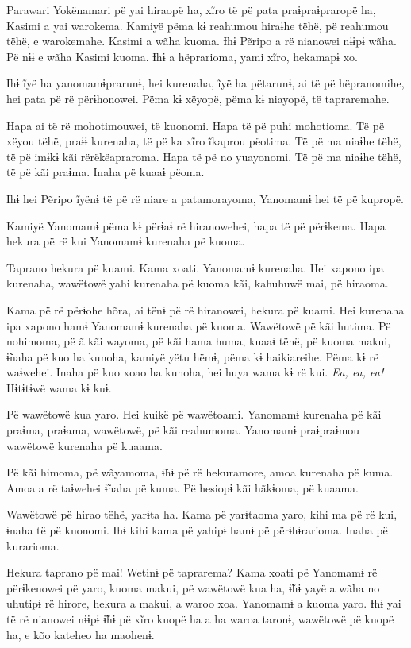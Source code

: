 Parawari Yokënamari pë yai hiraopë ha, xĩro të pë pata praɨpraɨpraropë
ha, Kasimi a yai warokema. Kamiyë pëma kɨ reahumou hiraɨhe tëhë, pë
reahumou tëhë, e warokemahe. Kasimi a wãha kuoma. Ɨhɨ Pẽripo a rë
nianowei nɨɨpɨ wãha. Pë nɨɨ e wãha Kasimi kuoma. Ɨhɨ a hëprarioma, yami
xĩro, hekamapɨ xo. 

Ɨhɨ ĩyë ha yanomamɨprarunɨ, hei kurenaha, ĩyë ha pëtarunɨ, ai të pë
hëpranomihe, hei pata pë rë përɨhonowei. Pëma kɨ xëyopë, pëma kɨ
niayopë, të tapraremahe. 

Hapa ai të rë mohotimouwei, të kuonomi. Hapa të pë puhi mohotioma. Të pë
xëyou tëhë, praɨɨ kurenaha, të pë ka xĩro ĩkaprou pëotima. Të pë ma
niaɨhe tëhë, të pë imɨkɨ kãi rërëkëapraroma. Hapa të pë no yuayonomi. Të
pë ma niaɨhe tëhë, të pë kãi praɨma. Ɨnaha pë kuaaɨ pëoma. 

Ɨhɨ hei Pẽripo ĩyënɨ të pë rë niare a patamorayoma, Yanomamɨ hei të pë
kupropë.  

Kamiyë Yanomamɨ pëma kɨ përɨaɨ rë hiranowehei, hapa të pë përɨkema. Hapa
hekura pë rë kui Yanomamɨ kurenaha pë kuoma. 

Taprano hekura pë kuami. Kama xoati. Yanomamɨ kurenaha. Hei xapono ipa
kurenaha, wawëtowë yahi kurenaha pë kuoma kãi, kahuhuwë mai, pë
hiraoma. 

Kama pë rë përɨohe hõra, ai tënɨ pë rë hiranowei, hekura pë kuami. Hei
kurenaha ipa xapono hamɨ Yanomamɨ kurenaha pë kuoma. Wawëtowë pë kãi
hutima. Pë nohimoma, pë ã kãi wayoma, pë kãi hama huma, kuaaɨ tëhë, pë
kuoma makui, ɨ̃naha pë kuo ha kunoha, kamiyë yëtu hëmɨ, pëma kɨ
haikiareihe. Pëma kɨ rë waɨwehei. Ɨnaha pë kuo xoao ha kunoha, hei huya
wama kɨ rë kui. \textit{Ea, ea, ea!} Hɨtɨtɨwë wama kɨ kuɨ. 

Pë wawëtowë kua yaro. Hei kuikë pë wawëtoami. Yanomamɨ kurenaha pë kãi
praɨma, praɨama, wawëtowë, pë kãi reahumoma. Yanomamɨ praɨpraɨmou
wawëtowë kurenaha pë kuaama. 

Pë kãi himoma, pë wãyamoma, ɨ̃hɨ pë rë hekuramore, amoa kurenaha pë kuma.
Amoa a rë taɨwehei ɨ̃naha pë kuma. Pë hesiopɨ kãi hãkɨoma, pë kuaama. 

Wawëtowë pë hirao tëhë, yarɨta ha. Kama pë yarɨtaoma yaro, kihi ma pë rë
kui, ɨnaha të pë kuonomi. Ɨhɨ kihi kama pë yahipɨ hamɨ pë përɨhɨrarioma.
Ɨnaha pë kurarioma. 

Hekura taprano pë mai! Wetinɨ pë taprarema? Kama xoati pë Yanomamɨ rë
përɨkenowei pë yaro, kuoma makui, pë wawëtowë kua ha, ɨ̃hɨ yayë a wãha no
uhutipɨ rë hirore, hekura a makui, a waroo xoa. Yanomamɨ a kuoma yaro.
Ɨhɨ yai të rë nianowei nɨɨpɨ ɨ̃hɨ pë xĩro kuopë ha a ha waroa taronɨ,
wawëtowë pë kuopë ha, e kõo kateheo ha maohenɨ. 


